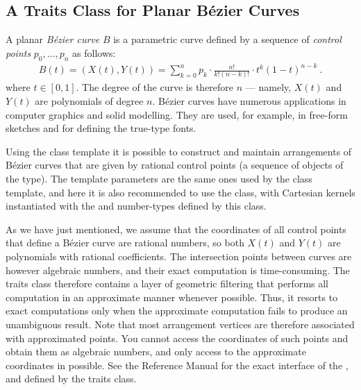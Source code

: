 
\subsection{A Traits Class for Planar B\'ezier Curves\label{arr_ssec:tr_bez}}

A planar {\em B\'ezier curve} $B$ is a parametric curve defined by a sequence
of {\em control points} $p_0, \ldots, p_n$ as follows:
\begin{eqnarray*}
B(t) = \left(X(t), Y(t)\right)
  = \sum_{k=0}^{n}{p_k \cdot \frac{n!}{k! (n-k)!} \cdot
                   t^k (1-t)^{n-k}}\ .
\end{eqnarray*}
where $t \in [0, 1]$. The degree of the curve is therefore $n$ ---
namely, $X(t)$ and $Y(t)$ are polynomials of degree $n$. B\'ezier curves
have numerous applications in computer graphics and solid modelling. They
are used, for example, in free-form sketches and for defining the true-type
fonts.

Using the 
class template it is possible to construct and maintain arrangements of
B\'ezier curves that are given by rational control points (a sequence
of objects of the  type). The template parameters
are the same ones used by the  class template, and
here it is also recommended to use the 
class, with Cartesian kernels instantiated
with the  and  number-types defined by this
class.

As we have just mentioned, we assume that the coordinates of all control
points that define a B\'ezier curve are rational numbers, so both $X(t)$
and $Y(t)$ are polynomials with rational coefficients. The intersection
points between curves are however algebraic numbers, and their exact
computation is time-consuming. The traits class therefore contains a layer
of geometric filtering that performs all computation in an approximate
manner whenever possible. Thus, it resorts to exact computations only when
the approximate computation fails to produce an unambiguous result.
Note that most arrangement vertices are therefore associated with approximated
points. You cannot access the coordinates of such points and obtain them as
algebraic numbers, and only access to the approximate coordinates in possible.
See the Reference Manual for the exact interface of the ,
 and  defined by the traits class.

